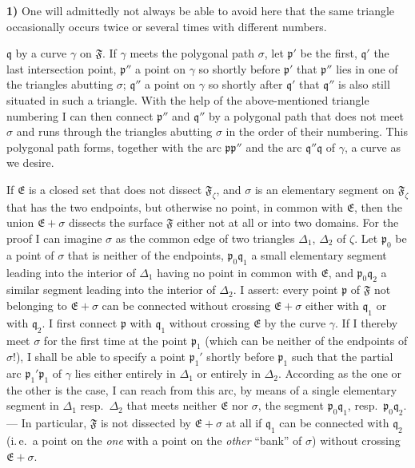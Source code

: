 \documentclass{article}
\begin{document}
\textbf{1)} One will admittedly not always be able to avoid here that the same triangle occasionally occurs twice or several times with different numbers.

$\mathfrak{q}$ by a curve $\gamma$ on $\mathfrak{F}$. If $\gamma$ meets the polygonal path $\sigma$, let $\mathfrak{p}'$ be the first, $\mathfrak{q}'$ the last intersection point, $\mathfrak{p}''$ a point on $\gamma$ so shortly before $\mathfrak{p}'$ that $\mathfrak{p}''$ lies in one of the triangles abutting $\sigma$; $\mathfrak{q}''$ a point on $\gamma$ so shortly after $\mathfrak{q}'$ that $\mathfrak{q}''$ is also still situated in such a triangle. With the help of the above-mentioned triangle numbering I can then connect $\mathfrak{p}''$ and $\mathfrak{q}''$ by a polygonal path that does not meet $\sigma$ and runs through the triangles abutting $\sigma$ in the order of their numbering. This polygonal path forms, together with the arc $\mathfrak{p}\mathfrak{p}''$ and the arc $\mathfrak{q}''\mathfrak{q}$ of $\gamma$, a curve as we desire.

If $\mathfrak{E}$ is a closed set that does not dissect $\mathfrak{F}_\zeta$, and $\sigma$ is an elementary segment on $\mathfrak{F}_\zeta$ that has the two endpoints, but otherwise no point, in common with $\mathfrak{E}$, then the union $\mathfrak{E} + \sigma$ dissects the surface $\mathfrak{F}$ either not at all or into two domains. For the proof I can imagine $\sigma$ as the common edge of two triangles $\Delta_1$, $\Delta_2$ of $\zeta$. Let $\mathfrak{p}_0$ be a point of $\sigma$ that is neither of the endpoints, $\mathfrak{p}_0\mathfrak{q}_1$ a small elementary segment leading into the interior of $\Delta_1$ having no point in common with $\mathfrak{E}$, and $\mathfrak{p}_0\mathfrak{q}_2$ a similar segment leading into the interior of $\Delta_2$. I assert: every point $\mathfrak{p}$ of $\mathfrak{F}$ not belonging to $\mathfrak{E} + \sigma$ can be connected without crossing $\mathfrak{E} + \sigma$ either with $\mathfrak{q}_1$ or with $\mathfrak{q}_2$. I first connect $\mathfrak{p}$ with $\mathfrak{q}_1$ without crossing $\mathfrak{E}$ by the curve $\gamma$. If I thereby meet $\sigma$ for the first time at the point $\mathfrak{p}_1$ (which can be neither of the endpoints of $\sigma$!), I shall be able to specify a point $\mathfrak{p}_1'$ shortly before $\mathfrak{p}_1$ such that the partial arc $\mathfrak{p}_1'\mathfrak{p}_1$ of $\gamma$ lies either entirely in $\Delta_1$ or entirely in $\Delta_2$. According as the one or the other is the case, I can reach from this arc, by means of a single elementary segment in $\Delta_1$ resp.\ $\Delta_2$ that meets neither $\mathfrak{E}$ nor $\sigma$, the segment $\mathfrak{p}_0\mathfrak{q}_1$, resp.\ $\mathfrak{p}_0\mathfrak{q}_2$. --- In particular, $\mathfrak{F}$ is not dissected by $\mathfrak{E} + \sigma$ at all if $\mathfrak{q}_1$ can be connected with $\mathfrak{q}_2$ (i.\,e.\ a point on the \emph{one} with a point on the \emph{other} ``bank'' of $\sigma$) without crossing $\mathfrak{E} + \sigma$.
\end{document}
